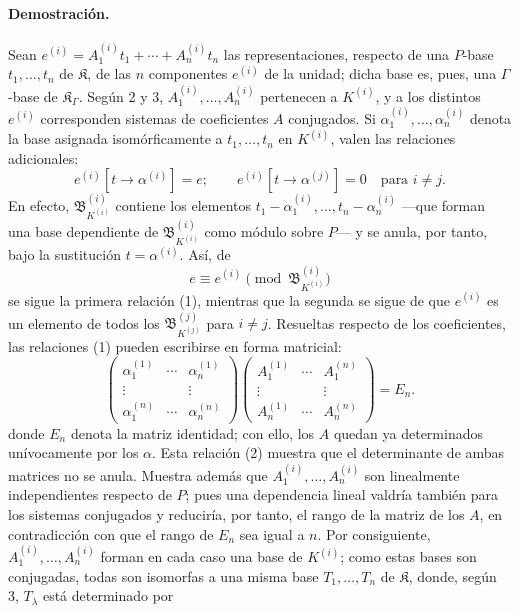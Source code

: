 \paragraph{Demostración.}
Sean $e^{(i)}=A_1^{(i)}t_1+\cdots+A_n^{(i)}t_n$ las representaciones, respecto de una $P$-base $t_1,\ldots,t_n$ de $\mathfrak K$, de las $n$ componentes $e^{(i)}$ de la unidad; dicha base es, pues, una $\Gamma$-base de $\mathfrak K_\Gamma$. Según 2 y 3, $A_1^{(i)},\ldots,A_n^{(i)}$ pertenecen a $K^{(i)}$, y a los distintos $e^{(i)}$ corresponden sistemas de coeficientes $A$ conjugados. Si $\alpha_1^{(i)},\ldots,\alpha_n^{(i)}$ denota la base asignada isomórficamente a $t_1,\ldots,t_n$ en $K^{(i)}$, valen las relaciones adicionales:
\begin{equation}
e^{(i)}[t\to\alpha^{(i)}]=e;
\qquad e^{(i)}[t\to\alpha^{(j)}]=0\quad\text{para }i\ne j. \tag{1}
\end{equation}
En efecto, $\mathfrak B_{K^{(i)}}^{(i)}$ contiene los elementos $t_1-\alpha_1^{(i)},\ldots,t_n-\alpha_n^{(i)}$ ---que forman una base dependiente de $\mathfrak B_{K^{(i)}}^{(i)}$ como módulo sobre $P$--- y se anula, por tanto, bajo la sustitución $t=\alpha^{(i)}$. Así, de
\[
e\equiv e^{(i)}\pmod{\mathfrak B_{K^{(i)}}^{(i)}}
\]
se sigue la primera relación (1), mientras que la segunda se sigue de que $e^{(i)}$ es un elemento de todos los $\mathfrak B_{K^{(j)}}^{(j)}$ para $i\ne j$. Resueltas respecto de los coeficientes, las relaciones (1) pueden escribirse en forma matricial:
\begin{equation}
\begin{pmatrix}
\alpha_1^{(1)}&\cdots&\alpha_n^{(1)}\\
\vdots&&\vdots\\
\alpha_1^{(n)}&\cdots&\alpha_n^{(n)}
\end{pmatrix}
\begin{pmatrix}
A_1^{(1)}&\cdots&A_1^{(n)}\\
\vdots&&\vdots\\
A_n^{(1)}&\cdots&A_n^{(n)}
\end{pmatrix}=E_n. \tag{2}
\end{equation}
donde $E_n$ denota la matriz identidad; con ello, los $A$ quedan ya determinados unívocamente por los $\alpha$. Esta relación (2) muestra que el determinante de ambas matrices no se anula. Muestra además que $A_1^{(i)},\ldots,A_n^{(i)}$ son linealmente independientes respecto de $P$; pues una dependencia lineal valdría también para los sistemas conjugados y reduciría, por tanto, el rango de la matriz de los $A$, en contradicción con que el rango de $E_n$ sea igual a $n$. Por consiguiente, $A_1^{(i)},\ldots,A_n^{(i)}$ forman en cada caso una base de $K^{(i)}$; como estas bases son conjugadas, todas son isomorfas a una misma base $T_1,\ldots,T_n$ de $\mathfrak K$, donde, según 3, $T_\lambda$ está determinado por
